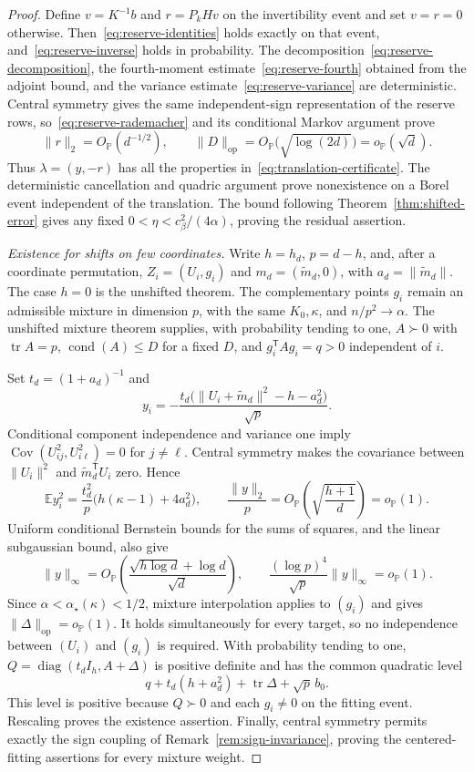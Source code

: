 \documentclass[11pt]{article}
\newcommand{\Pbb}{\mathbb P}
\newcommand{\E}{\mathbb E}
\DeclareMathOperator{\tr}{tr}
\DeclareMathOperator{\cond}{cond}
\newcommand{\opnorm}[1]{\lVert#1\rVert_{\mathrm{op}}}
\newcommand{\norm}[1]{\lVert#1\rVert}
\newcommand{\OP}{O_{\Pbb}}
\newcommand{\oP}{o_{\Pbb}}
\theoremstyle{remark}
\begin{document}
\begin{proof}
Define $v=K^{-1}b$ and $r=P_kHv$ on the invertibility event and set
$v=r=0$ otherwise. Then~\eqref{eq:reserve-identities} holds exactly
on that event, and~\eqref{eq:reserve-inverse} holds in probability.
The decomposition~\eqref{eq:reserve-decomposition}, the fourth-moment
estimate~\eqref{eq:reserve-fourth} obtained from the adjoint bound,
and the variance estimate~\eqref{eq:reserve-variance} are deterministic.
Central symmetry gives the same independent-sign representation of
the reserve rows, so~\eqref{eq:reserve-rademacher} and its conditional
Markov argument prove
\[
 \norm r_2=\OP(d^{-1/2}),\qquad
 \opnorm D=\OP\big(\sqrt{\log(2d)}\big)=\oP(\sqrt d).
\]
Thus $\lambda=(y,-r)$ has all the properties
in~\eqref{eq:translation-certificate}. The deterministic cancellation
and quadric argument prove nonexistence on a Borel event independent
of the translation. The bound following
Theorem~\ref{thm:shifted-error} gives any fixed
$0<\eta<c_\beta^2/(4\alpha)$, proving the residual assertion.

\emph{Existence for shifts on few coordinates.}
Write $h=h_d$, $p=d-h$, and, after a coordinate permutation,
$Z_i=(U_i,g_i)$ and $m_d=(\widetilde m_d,0)$, with
$a_d=\norm{\widetilde m_d}$. The case $h=0$ is the unshifted theorem.
The complementary points $g_i$ remain an admissible mixture in
dimension $p$, with the same $K_0,\kappa$, and $n/p^2\to\alpha$.
The unshifted mixture theorem supplies, with probability tending to
one, $A\succ0$ with $\tr A=p$, $\cond(A)\le D$ for a fixed $D$, and
$g_i^{\mathsf T}Ag_i=q>0$ independent of $i$.

Set $t_d=(1+a_d)^{-1}$ and
\[
 y_i=-\frac{t_d\big(\norm{U_i+\widetilde m_d}^2-h-a_d^2\big)}{\sqrt p}.
\]
Conditional component independence and variance one imply
$\operatorname{Cov}(U_{ij}^2,U_{i\ell}^2)=0$ for $j\ne\ell$.
Central symmetry makes the covariance between
$\norm{U_i}^2$ and $\widetilde m_d^{\mathsf T}U_i$ zero. Hence
\[
 \E y_i^2=\frac{t_d^2}{p}\big(h(\kappa-1)+4a_d^2\big),\qquad
 \frac{\norm y_2}{p}=\OP\left(\sqrt{\frac{h+1}{d}}\right)=\oP(1).
\]
Uniform conditional Bernstein bounds for the sums of squares, and
the linear subgaussian bound, also give
\[
 \norm y_\infty
 =\OP\left(\frac{\sqrt{h\log d}+\log d}{\sqrt d}\right),\qquad
 \frac{(\log p)^4}{\sqrt p}\norm y_\infty=\oP(1).
\]
Since $\alpha<\alpha_\star(\kappa)<1/2$, mixture interpolation applies
to $(g_i)$ and gives $\opnorm\Delta=\oP(1)$. It holds simultaneously
for every target, so no independence between $(U_i)$ and $(g_i)$ is
required. With probability tending to one,
$Q=\operatorname{diag}(t_dI_h,A+\Delta)$ is positive definite and has
the common quadratic level
\[
 q+t_d(h+a_d^2)+\tr\Delta+\sqrt p\,b_0.
\]
This level is positive because $Q\succ0$ and each $g_i\ne0$ on the
fitting event. Rescaling proves the existence assertion.
Finally, central symmetry permits exactly the sign coupling of
Remark~\ref{rem:sign-invariance}, proving the centered-fitting
assertions for every mixture weight.
\end{proof}
\end{document}
